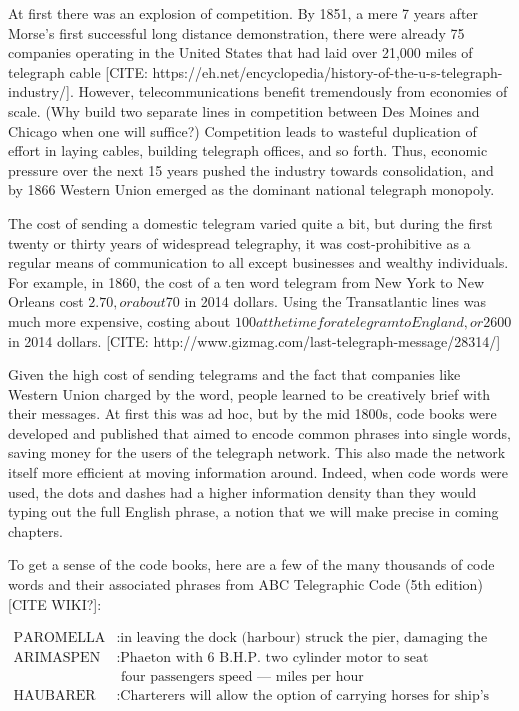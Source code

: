 \documentclass[UTF8]{book}
\begin{document}
\begin{CJK}{UTF8}{gbsn}
At first there was an explosion of competition. By 1851, a mere 7 years after Morse's first successful long distance demonstration, there were already 75 companies operating in the United States that had laid over 21,000 miles of telegraph cable [CITE: https://eh.net/encyclopedia/history-of-the-u-s-telegraph-industry/]. However, telecommunications benefit tremendously from economies of scale. (Why build two separate lines in competition between Des Moines and Chicago when one will suffice?) Competition leads to wasteful duplication of effort in laying cables, building telegraph offices, and so forth. Thus, economic pressure over the next 15 years pushed the industry towards consolidation, and by 1866 Western Union emerged as the dominant national telegraph monopoly.

The cost of sending a domestic telegram varied quite a bit, but during the first twenty or thirty years of widespread telegraphy, it was cost-prohibitive as a regular means of communication to all except businesses and wealthy individuals. For example, in 1860, the cost of a ten word telegram from New York to New Orleans cost $2.70, or about $70 in 2014 dollars. Using the Transatlantic lines was much more expensive, costing about $100 at the time for a telegram to England, or $2600 in 2014 dollars. [CITE: http://www.gizmag.com/last-telegraph-message/28314/]

Given the high cost of sending telegrams and the fact that companies like Western Union charged by the word, people learned to be creatively brief with their messages. At first this was ad hoc, but by the mid 1800s, code books were developed and published that aimed to encode common phrases into single words, saving money for the users of the telegraph network. This also made the network itself more efficient at moving information around. Indeed, when code words were used, the dots and dashes had a higher information density than they would typing out the full English phrase, a notion that we will make precise in coming chapters.

To get a sense of the code books, here are a few of the many thousands of code words and their associated phrases from ABC Telegraphic Code (5th edition) [CITE WIKI?]:

\begin{align*}
	\text{PAROMELLA} &: \text{in leaving the dock (harbour) struck the pier, damaging the stern} \\
	\text{ARIMASPEN } &: \text{Phaeton with 6 B.H.P. two cylinder motor to seat} \\
         & \text{   four passengers speed — miles per hour} \\
	\text{HAUBARER  } &: \text{Charterers will allow the option of carrying horses for ship's benefit} \\
\end{align*}


\end{CJK}
\end{document}
